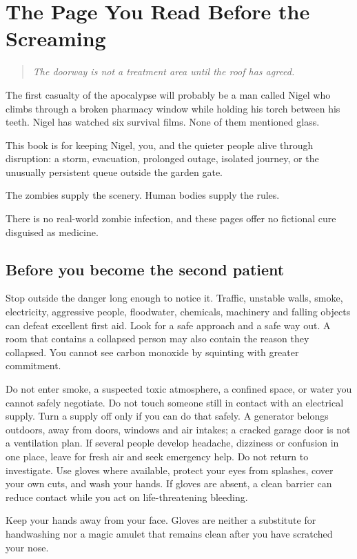 \documentclass[10pt,openright]{book}
\begin{document}
\chapter{The Page You Read Before the Screaming}
\begin{quote}\emph{The doorway is not a treatment area until the roof has agreed.}\end{quote}
The first casualty of the apocalypse will probably be a man called Nigel who climbs through a broken pharmacy window while holding his torch between his teeth. Nigel has watched six survival films. None of them mentioned glass.

This book is for keeping Nigel, you, and the quieter people alive through disruption: a storm, evacuation, prolonged outage, isolated journey, or the unusually persistent queue outside the garden gate.

The zombies supply the scenery. Human bodies supply the rules.

There is no real-world zombie infection, and these pages offer no fictional cure disguised as medicine.

\section*{Before you become the second patient}
Stop outside the danger long enough to notice it. Traffic, unstable walls, smoke, electricity, aggressive people, floodwater, chemicals, machinery and falling objects can defeat excellent first aid. Look for a safe approach and a safe way out. A room that contains a collapsed person may also contain the reason they collapsed. You cannot see carbon monoxide by squinting with greater commitment.

Do not enter smoke, a suspected toxic atmosphere, a confined space, or water you cannot safely negotiate. Do not touch someone still in contact with an electrical supply. Turn a supply off only if you can do that safely. A generator belongs outdoors, away from doors, windows and air intakes; a cracked garage door is not a ventilation plan. If several people develop headache, dizziness or confusion in one place, leave for fresh air and seek emergency help. Do not return to investigate. Use gloves where available, protect your eyes from splashes, cover your own cuts, and wash your hands. If gloves are absent, a clean barrier can reduce contact while you act on life-threatening bleeding.

Keep your hands away from your face. Gloves are neither a substitute for handwashing nor a magic amulet that remains clean after you have scratched your nose.
\end{document}
